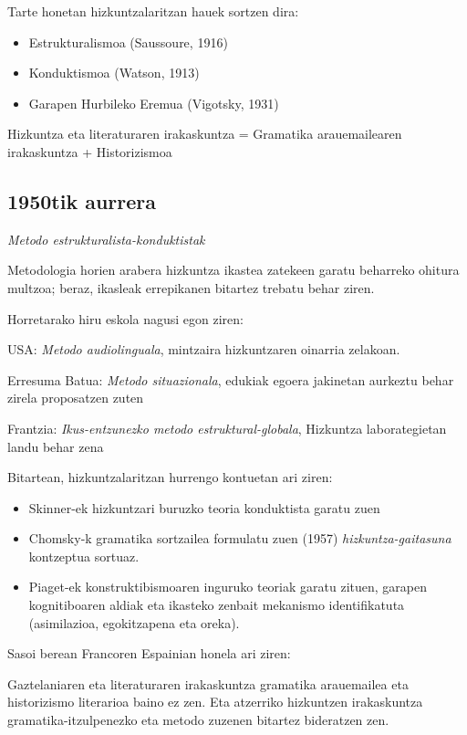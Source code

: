 \documentclass[
]{book}
\providecommand{\tightlist}{%
  \setlength{\itemsep}{0pt}\setlength{\parskip}{0pt}}
\begin{document}
Tarte honetan hizkuntzalaritzan hauek sortzen dira:

\begin{itemize}
\tightlist
\item
  Estrukturalismoa (Saussoure, 1916)
\item
  Konduktismoa (Watson, 1913)
\item
  Garapen Hurbileko Eremua (Vigotsky, 1931)
\end{itemize}

Hizkuntza eta literaturaren irakaskuntza = Gramatika arauemailearen irakaskuntza + Historizismoa

\hypertarget{tik-aurrera}{%
\subsection{1950tik aurrera}\label{tik-aurrera}}

\emph{Metodo estrukturalista-konduktistak}

Metodologia horien arabera hizkuntza ikastea zatekeen garatu beharreko ohitura multzoa; beraz, ikasleak errepikanen bitartez trebatu behar ziren.

Horretarako hiru eskola nagusi egon ziren:

USA: \emph{Metodo audiolinguala}, mintzaira hizkuntzaren oinarria zelakoan.

Erresuma Batua: \emph{Metodo situazionala}, edukiak egoera jakinetan aurkeztu behar zirela proposatzen zuten

Frantzia: \emph{Ikus-entzunezko metodo estruktural-globala}, Hizkuntza laborategietan landu behar zena

Bitartean, hizkuntzalaritzan hurrengo kontuetan ari ziren:

\begin{itemize}
\tightlist
\item
  Skinner-ek hizkuntzari buruzko teoria konduktista garatu zuen
\item
  Chomsky-k gramatika sortzailea formulatu zuen (1957) \emph{hizkuntza-gaitasuna} kontzeptua sortuaz.
\item
  Piaget-ek konstruktibismoaren inguruko teoriak garatu zituen, garapen kognitiboaren aldiak eta ikasteko zenbait mekanismo identifikatuta (asimilazioa, egokitzapena eta oreka).
\end{itemize}

Sasoi berean Francoren Espainian honela ari ziren:

Gaztelaniaren eta literaturaren irakaskuntza gramatika arauemailea eta historizismo literarioa baino ez zen.
Eta atzerriko hizkuntzen irakaskuntza gramatika-itzulpenezko eta metodo zuzenen bitartez bideratzen zen.
\end{document}
